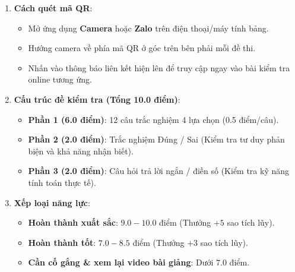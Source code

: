 \begin{tcolorbox}[
  enhanced,
  colback=white,
  colframe=teal!70!black,
  arc=2.5mm,
  boxrule=0.8pt,
  left=3mm, right=3mm, top=2.5mm, bottom=2.5mm
]
  \begin{enumerate}[\bfseries 1.]
    \item \textbf{Cách quét mã QR}:
      \begin{itemize}
        \item Mở ứng dụng \textbf{Camera} hoặc \textbf{Zalo} trên điện thoại/máy tính bảng.
        \item Hướng camera về phía mã QR ở góc trên bên phải mỗi đề thi.
        \item Nhấn vào thông báo liên kết hiện lên để truy cập ngay vào bài kiểm tra online tương ứng.
      \end{itemize}
    \item \textbf{Cấu trúc đề kiểm tra (Tổng 10.0 điểm)}:
      \begin{itemize}
        \item \textbf{Phần 1 (6.0 điểm)}: 12 câu trắc nghiệm 4 lựa chọn (0.5 điểm/câu).
        \item \textbf{Phần 2 (2.0 điểm)}: Trắc nghiệm Đúng / Sai (Kiểm tra tư duy phản biện và khả năng nhận biết).
        \item \textbf{Phần 3 (2.0 điểm)}: Câu hỏi trả lời ngắn / điền số (Kiểm tra kỹ năng tính toán thực tế).
      \end{itemize}
    \item \textbf{Xếp loại năng lực}:
      \begin{itemize}
        \item \textbf{Hoàn thành xuất sắc}: $9.0 - 10.0$ điểm (Thưởng $+5$ sao tích lũy).
        \item \textbf{Hoàn thành tốt}: $7.0 - 8.5$ điểm (Thưởng $+3$ sao tích lũy).
        \item \textbf{Cần cố gắng \& xem lại video bài giảng}: Dưới $7.0$ điểm.
      \end{itemize}
  \end{enumerate}
\end{tcolorbox}
